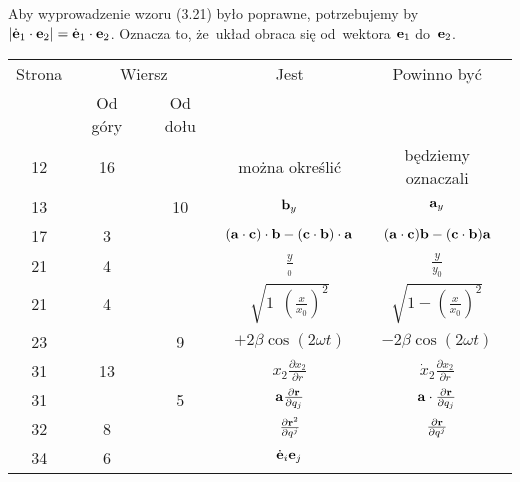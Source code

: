 \documentclass[a4paper,11pt]{article}
\begin{document}
\vspace{\spaceFour}





\noindent
{} Aby wyprowadzenie wzoru (3.21) było poprawne,
potrzebujemy by
$| \dot{ \mathbf{e} }_{ 1 } \cdot \mathbf{e}_{ 2 } | = \dot{ \mathbf{e} }_{ 1 }
\cdot \mathbf{e}_{ 2 }$. Oznacza to, że~układ obraca się od~wektora
$\mathbf{e}_{ 1 }$ do~$\mathbf{e}_{ 2 }$.





\newpage



\begin{center}

  \begin{tabular}{|c|c|c|c|c|}
    \hline
    Strona & \multicolumn{2}{c|}{Wiersz} & Jest
                              & Powinno być \\ \cline{2-3}
    & Od góry & Od dołu & & \\
    \hline
    12  & 16 & & można określić & będziemy oznaczali \\
    13  & & 10 & $\mathbf{b}_{ y }$ & $\mathbf{a}_{ y }$ \\
    17  &  3 & & $( \mathbf{a} \cdot \mathbf{c} ) \cdot \mathbf{b}
                 - ( \mathbf{c} \cdot \mathbf{b} ) \cdot \mathbf{a}$
           & $( \mathbf{a} \cdot \mathbf{c} ) \mathbf{b}
             - ( \mathbf{c} \cdot \mathbf{b} ) \mathbf{a}$ \\
    21  &  4 & & $\frac{ y }{ { }_{ 0 } }$ & $\frac{ y }{ { y }_{ 0 } }$ \\
    21  &  4 & & $\sqrt{ 1 \:\: \left( \frac{ x }{ x_{ 0 } } \right)^{ 2 } }$
           & $\sqrt{ 1 - \left( \frac{ x }{ x_{ 0 } } \right)^{ 2 } } $ \\
    23  & &  9 & $+2\beta \cos( 2\omega t )$ & $-2\beta \cos( 2\omega t )$ \\
    31  & 13 & & $x_{ 2 } \frac{ \partial x_{ 2 } }{ \partial r }$
           & $\dot{ x }_{ 2 } \frac{ \partial x_{ 2 } }{ \partial r }$ \\
    31  & &  5 & $\mathbf{a} \frac{ \partial \mathbf{r} }{ \partial q_{ j } }$
           & $\mathbf{a} \cdot \frac{ \partial \mathbf{r} }{ \partial q_{ j } }$ \\
    32  &  8 & & $\frac{ \partial \mathbf{r}^{ 2 } }{ \partial { q^{ j } } }$
           & $\frac{ \partial \mathbf{r} }{ \partial { q^{ j } } }$ \\
    34  &  6 & & $\dot{ \mathbf{e} }_{ i } \mathbf{e}_{ j }$

\end{tabular}
\end{center}
\end{document}

